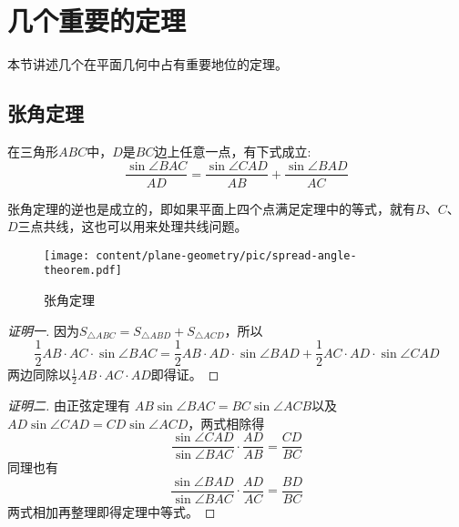 
\section{几个重要的定理}
\label{sec:some-import-plane-geometry-theorem}

本节讲述几个在平面几何中占有重要地位的定理。

\subsection{张角定理}
\label{sec:spread-angle-theorem}

\begin{theorem}[张角定理]
  在三角形$ABC$中，$D$是$BC$边上任意一点，有下式成立:
  \begin{equation}
    \label{eq:spread-angle-theorem}
    \frac{\sin{\angle{BAC}}}{AD} = \frac{\sin{\angle{CAD}}}{AB} + \frac{\sin{\angle{BAD}}}{AC}
  \end{equation}
\end{theorem}

张角定理的逆也是成立的，即如果平面上四个点满足定理中的等式，就有$B$、$C$、$D$三点共线，这也可以用来处理共线问题。

  \begin{figure}[htbp]
  \centering
\texttt{[image: content/plane-geometry/pic/spread-angle-theorem.pdf]}
\caption{张角定理}
\label{fig:spread-angle-theorem}
\end{figure}

\begin{proof}[证明一]
  因为$S_{\triangle ABC} = S_{\triangle ABD} + S_{\triangle ACD}$，所以
  \begin{equation*}
    \frac{1}{2}AB \cdot AC \cdot \sin{\angle BAC} =
    \frac{1}{2}AB \cdot AD \cdot \sin{\angle BAD} +
    \frac{1}{2}AC \cdot AD \cdot \sin{\angle CAD} 
  \end{equation*}
  两边同除以$\frac{1}{2}AB \cdot AC \cdot AD$即得证。
\end{proof}

\begin{proof}[证明二]
  由正弦定理有 $AB \sin{\angle BAC} = BC \sin{\angle ACB}$以及$AD \sin{\angle CAD} = CD \sin{\angle ACD}$，两式相除得
  \[
    \frac{\sin{\angle CAD}}{\sin{\angle BAC}} \cdot \frac{AD}{AB} = \frac{CD}{BC}
  \]
  同理也有
  \[
    \frac{\sin{\angle BAD}}{\sin{\angle BAC}} \cdot \frac{AD}{AC} = \frac{BD}{BC}
  \]
  两式相加再整理即得定理中等式。
\end{proof}


